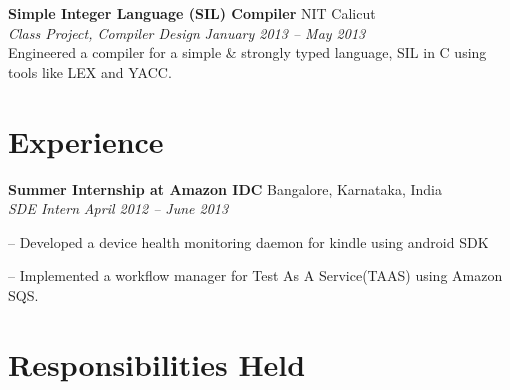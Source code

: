\documentclass[margin,line]{resume}
\begin{document}
\begin{resume}
	\vspace{2mm}%

	\textbf{Simple Integer Language (SIL) Compiler} 						\hfill NIT Calicut
	\\
    \textit{Class Project, Compiler Design} 	\hfill \textit{January 2013 -- May 2013}
    \\
	Engineered a compiler for a simple \& strongly typed language, SIL in C using tools like LEX and YACC.
  
   \vspace{2mm}%
   
      
    \section{\mysidestyle Experience } 
	 \textbf{Summer Internship at Amazon IDC} \hfill Bangalore, Karnataka, India
	 \\
     \textit{SDE Intern} \hfill \textit{April 2012 -- June 2013}
    
    \begin{compactitem}
        \item[--] Developed a device health monitoring daemon for kindle using android SDK
        \item[--] Implemented a workflow manager for Test                                                                                                                                                                                                                                                                                                                                                                                                                                                                                                                                                                                                                                                                                                           As A Service(TAAS) using Amazon SQS.
    \end{compactitem}
    
    \vspace{2mm}
    
    \section{\mysidestyle Responsibilities Held } 
	

\end{resume}
\end{document}
